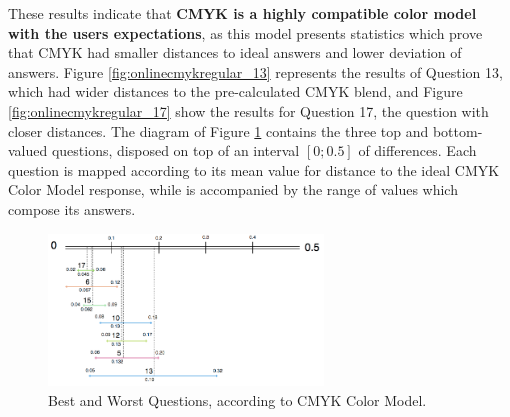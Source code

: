 %
These results indicate that \textbf{CMYK is a highly compatible color model with the users expectations}, as this model presents statistics which prove that CMYK had smaller distances to ideal answers and lower deviation of answers.
Figure \ref{fig:onlinecmykregular_13} represents the results of Question 13, which had wider distances to the pre-calculated CMYK blend, and Figure \ref{fig:onlinecmykregular_17} show the results for Question 17, the question with closer
distances. The diagram of Figure \ref{fig:cmyk_analysis} contains the three top and bottom-valued questions, disposed on top of an interval $[0 ; 0.5]$ of differences. Each question is mapped according to its mean value for
distance to the ideal CMYK Color Model response, while is accompanied by the range of values which compose its answers. \par
%
\begin{figure}[!htbp]
  \centering
  \vspace{-15pt}
  \includegraphics[width=0.65\textwidth]{images/results/cmyk_questions_analysis.png}
  \caption[Best and Worst Questions, according to CMYK Color Model.]{Best and Worst Questions, according to CMYK Color Model.}
  \vspace{-5pt}
  \label{fig:cmyk_analysis}
\end{figure}
%
%
